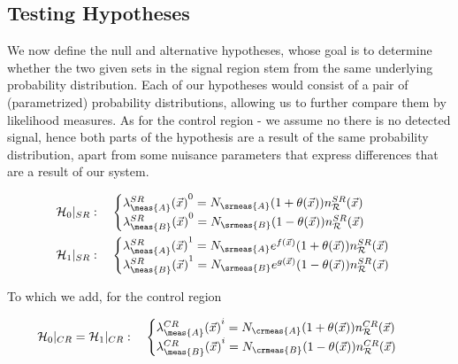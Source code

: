 \documentclass[../../ddppaper2.tex]{subfiles}
\begin{document}
\subsection{Testing Hypotheses}

We now define the null and alternative hypotheses, whose goal is to determine whether the two given sets in the signal region stem from the same underlying probability distribution. Each of our hypotheses would consist of a pair of (parametrized) probability distributions, allowing us to further compare them by likelihood measures.
As for the control region - we assume no there is no detected signal, hence both parts of the hypothesis are a result of the same probability distribution, apart from some nuisance parameters that express differences that are a result of our system.

\begin{equation}
\label{eq:sr_hypothesis_statement}
\begin{aligned}
    \nullhypothesis |_{SR} &: \quad
    \begin{cases}
        {\srdist{\meas{A}}^0} = N_\srmeas{A} (1 + {\nparam(\anyevent)}) \srrefdist \\
        {\srdist{\meas{B}}^0} = N_\srmeas{B} (1 - {\nparam(\anyevent)}) \srrefdist
    \end{cases} \\
    \hypothesis{1} |_{SR} &: \quad
    \begin{cases}
        {\srdist{\meas{A}}^1} = N_\srmeas{A} e^{f(\anyevent)} (1 + {\nparam(\anyevent)}) \srrefdist \\
        {\srdist{\meas{B}}^1} = N_\srmeas{B} e^{g(\anyevent)} (1 - {\nparam(\anyevent)}) \srrefdist
    \end{cases}
\end{aligned}
\end{equation}

To which we add, for the control region

\begin{equation}
\label{eq:cr_hypothesis_statement}
\begin{aligned}
    \nullhypothesis |_{CR} = \hypothesis{1} |_{CR} &: \quad
    \begin{cases}
        \crdist{\meas{A}}^i = N_\crmeas{A} (1 + {\nparam(\anyevent)}) \crrefdist \\
        \crdist{\meas{B}}^i = N_\crmeas{B} (1 - {\nparam(\anyevent)}) \crrefdist
    \end{cases}
\end{aligned}
\end{equation}
\end{document}
